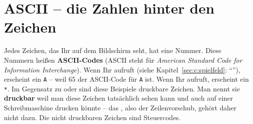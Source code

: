 \section{ASCII -- die Zahlen hinter den Zeichen}
\label{sec:referenz:ascii}

Jedes Zeichen, das Ihr auf dem Bildschirm seht, hat eine Nummer. Diese Nummern heißen \textbf{ASCII-Codes} (ASCII steht für \emph{American Standard Code for Information Interchange}). Wenn Ihr  aufruft (siehe Kapitel~\ref{sec:c:spielfeld}: ``''), erscheint ein \texttt{A} -- weil 65 der ASCII-Code für \texttt{A} ist. Wenn Ihr  aufruft, erscheint ein \texttt{*}. Im Gegensatz zu  oder  sind diese Beispiele druckbare Zeichen. Man nennt sie  \textbf{druckbar} weil man diese Zeichen tatsächlich sehen kann und auch auf einer Schreibmaschine drucken könnte -- das , also der Zeilenvorschub, gehört daher nicht dazu. Die nicht druckbaren Zeichen sind Steuercodes. 

